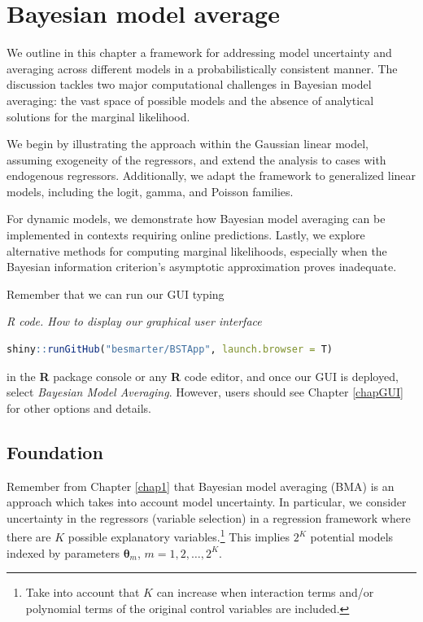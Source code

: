 \chapter{Bayesian model average}\label{chap10}

We outline in this chapter a framework for addressing model uncertainty and averaging across different models in a probabilistically consistent manner. The discussion tackles two major computational challenges in Bayesian model averaging: the vast space of possible models and the absence of analytical solutions for the marginal likelihood.

We begin by illustrating the approach within the Gaussian linear model, assuming exogeneity of the regressors, and extend the analysis to cases with endogenous regressors. Additionally, we adapt the framework to generalized linear models, including the logit, gamma, and Poisson families.

For dynamic models, we demonstrate how Bayesian model averaging can be implemented in contexts requiring online predictions. Lastly, we explore alternative methods for computing marginal likelihoods, especially when the Bayesian information criterion's asymptotic approximation proves inadequate.  

Remember that we can run our GUI typing

\begin{tcolorbox}[enhanced,width=4.67in,center upper,
	fontupper=\large\bfseries,drop shadow southwest,sharp corners]
	\textit{R code. How to display our graphical user interface}
	\begin{VF}
		\begin{lstlisting}[language=R]
	shiny::runGitHub("besmarter/BSTApp", launch.browser = T)\end{lstlisting}
	\end{VF}
\end{tcolorbox} 

in the \textbf{R} package console or any \textbf{R} code editor, and once our GUI is deployed, select \textit{Bayesian Model Averaging}. However, users should see Chapter \ref{chapGUI} for other options and details.

\section{Foundation}\label{sec10_1}
Remember from Chapter \ref{chap1} that Bayesian model averaging (BMA) is an approach which takes into account model uncertainty. In particular, we consider uncertainty in the regressors (variable selection) in a regression framework where there are $K$ possible explanatory variables.\footnote{Take into account that $K$ can increase when interaction terms and/or polynomial terms of the original control variables are included.} This implies $2^K$ potential models indexed by parameters $\bm{\theta}_m$, $m=1,2,\dots,2^K$.

